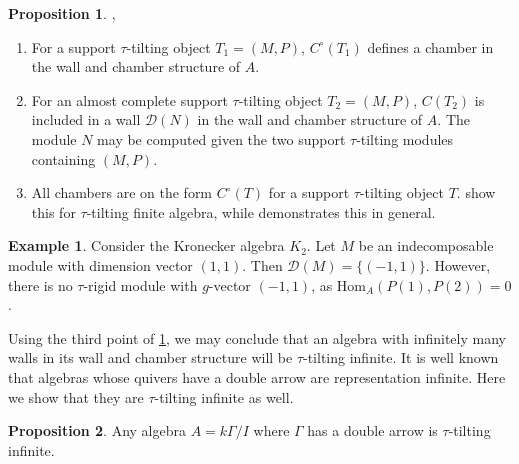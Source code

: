 \documentclass[]{article}
\theoremstyle{definition}
\newtheorem{proposition}{Proposition}[section]
\newtheorem{example}{Example}[section]
\newcommand{\tu}{\ensuremath{\tau}}
\begin{document}
\begin{proposition}\cite[Proposition 3.15, Corollary 3.16, Corollary 3.21]{Br_stle_2019}\label{tau-wall-chamber-result}, \cite[Theorem 3.17]{asai2020wallchamber}
	\begin{enumerate}
		\item For a support \tu-tilting object $T_1 = (M,P)$, $C^\circ(T_1)$ defines a chamber in the wall and chamber structure of $A$.
		\item For an almost complete support \tu-tilting object $T_2 = (M,P)$, $C(T_2)$ is included in a wall $\mathcal{D}(N)$ in the wall and chamber structure of $A$. The module $N$ may be computed given the two support \tu-tilting modules containing $(M,P)$.
		\item All chambers are on the form $C^\circ(T)$ for a support \tu-tilting object $T$. \cite{Br_stle_2019} show this for \tu-tilting finite algebra, while \cite{asai2020wallchamber} demonstrates this in general. 
		
	\end{enumerate}
\end{proposition}


\begin{example}
	Consider the Kronecker algebra $K_2$. Let $M$ be an indecomposable module with dimension vector $(1,1)$. Then $\mathcal{D}(M) = \{(-1,1)\}$. However, there is no \tu-rigid module with $g$-vector $(-1,1)$, as $\text{Hom}_A(P(1),P(2)) = 0$.
\end{example}


Using the third point of \cref{tau-wall-chamber-result}, we may conclude that an algebra with infinitely many walls in its wall and chamber structure will be \tu-tilting infinite. It is well known that algebras whose quivers have a double arrow are representation infinite. Here we show that they are \tu-tilting infinite as well.
\begin{proposition}
	Any algebra $A = k\Gamma/I$ where $\Gamma$ has a double arrow is \tu-tilting infinite.
\end{proposition}
\end{document}

